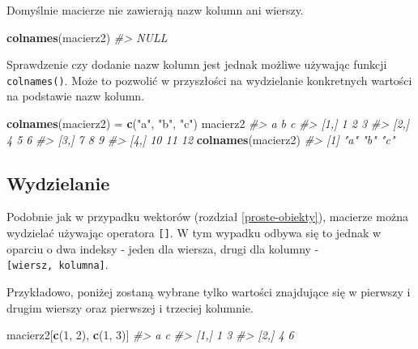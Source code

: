 \documentclass[paper=6in:9in,pagesize=pdftex,headinclude=on,footinclude=on,10pt]{scrbook}
\newenvironment{Shaded}{\begin{snugshade}}{\end{snugshade}}
\newcommand{\CommentTok}[1]{\textcolor[rgb]{0.56,0.35,0.01}{\textit{#1}}}
\newcommand{\DecValTok}[1]{\textcolor[rgb]{0.00,0.00,0.81}{#1}}
\newcommand{\KeywordTok}[1]{\textcolor[rgb]{0.13,0.29,0.53}{\textbf{#1}}}
\newcommand{\NormalTok}[1]{#1}
\newcommand{\StringTok}[1]{\textcolor[rgb]{0.31,0.60,0.02}{#1}}
\begin{document}
Domyślnie macierze nie zawierają nazw kolumn ani wierszy.

\begin{Shaded}
\begin{Highlighting}[]
\KeywordTok{colnames}\NormalTok{(macierz2)}
\CommentTok{#> NULL}
\end{Highlighting}
\end{Shaded}

Sprawdzenie czy dodanie nazw kolumn jest jednak możliwe używając funkcji \texttt{colnames()}.
Może to pozwolić w przyszłości na wydzielanie konkretnych wartości na podstawie nazw kolumn.

\begin{Shaded}
\begin{Highlighting}[]
\KeywordTok{colnames}\NormalTok{(macierz2) =}\StringTok{ }\KeywordTok{c}\NormalTok{(}\StringTok{"a"}\NormalTok{, }\StringTok{"b"}\NormalTok{, }\StringTok{"c"}\NormalTok{)}
\NormalTok{macierz2}
\CommentTok{#>       a  b  c}
\CommentTok{#> [1,]  1  2  3}
\CommentTok{#> [2,]  4  5  6}
\CommentTok{#> [3,]  7  8  9}
\CommentTok{#> [4,] 10 11 12}
\KeywordTok{colnames}\NormalTok{(macierz2)}
\CommentTok{#> [1] "a" "b" "c"}
\end{Highlighting}
\end{Shaded}

\hypertarget{wydzielanie-1}{%
\subsection{Wydzielanie}\label{wydzielanie-1}}

Podobnie jak w przypadku wektorów (rozdział \ref{proste-obiekty}), macierze można wydzielać używając operatora \texttt{{[}{]}}.
W tym wypadku odbywa się to jednak w oparciu o dwa indeksy - jeden dla wiersza, drugi dla kolumny - \texttt{{[}wiersz,\ kolumna{]}}.

Przykładowo, poniżej zostaną wybrane tylko wartości znajdujące się w pierwszy i drugim wierszy oraz pierwszej i trzeciej kolumnie.

\begin{Shaded}
\begin{Highlighting}[]
\NormalTok{macierz2[}\KeywordTok{c}\NormalTok{(}\DecValTok{1}\NormalTok{, }\DecValTok{2}\NormalTok{), }\KeywordTok{c}\NormalTok{(}\DecValTok{1}\NormalTok{, }\DecValTok{3}\NormalTok{)]}
\CommentTok{#>      a c}
\CommentTok{#> [1,] 1 3}
\CommentTok{#> [2,] 4 6}
\end{Highlighting}
\end{Shaded}
\end{document}
